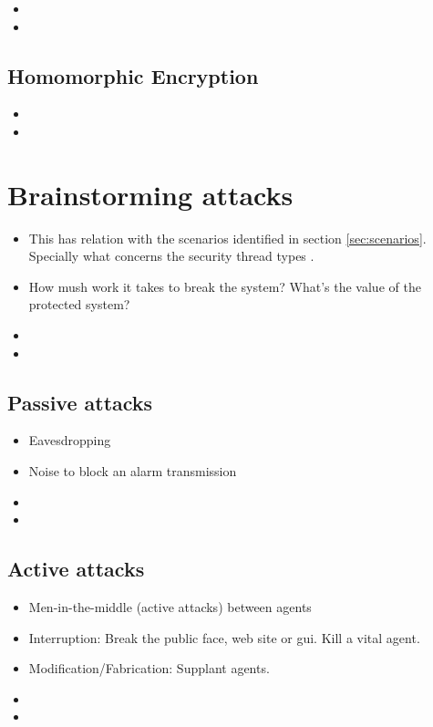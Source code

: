 \documentclass[10pt,a4paper,twoside]{llncs}
\begin{document}
\begin{itemize}
 \item 
 \item 
\end{itemize}

%
\subsection{Homomorphic Encryption \label{sec:Homorph}}
\begin{itemize}
 \item 
 \item 
\end{itemize}

%
\section{Brainstorming attacks \label{sec:attacks}}

\begin{itemize}
 \item This has relation with the scenarios identified in section \ref{sec:scenarios}. Specially what concerns the security thread types \cite{SecEngRossAnderson}.
 \item How mush work it takes to break the system? What's the value of the protected system?
 \item 
 \item
\end{itemize}

%
\subsection{Passive attacks \label{sec:passiveAttacks}}

\begin{itemize}
 \item Eavesdropping
 \item Noise to block an alarm transmission
 \item 
 \item 
\end{itemize}

%
\subsection{Active attacks \label{sec:activeAttacks}}

\begin{itemize}
 \item Men-in-the-middle (active attacks) between agents
 \item Interruption: Break the public face, web site or gui. Kill a vital agent.
 \item Modification/Fabrication: Supplant agents.
 \item 
 \item 
\end{itemize}
\end{document}
